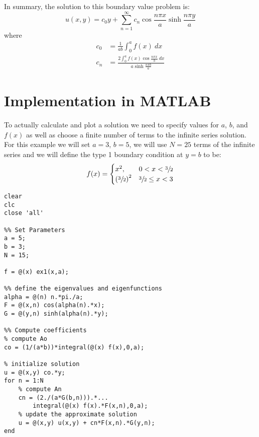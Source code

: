 \vspace{0.25cm}

\noindent In summary, the solution to this boundary value problem is:
\begin{equation*}
u(x,y) = c_0y + \sum\limits_{n=1}^{\infty} c_n \cos{\frac{n \pi x}{a}} \sinh{\frac{n \pi y}{a}}
\end{equation*}
where
\begin{align*}
c_0 &= \frac{1}{ab}\int_0^a f(x) \ dx \\
c_n &= \frac{2\int_0^a f(x) \cos{\frac{n \pi x}{b}} \ dx}{a \sinh{\frac{n \pi b}{a}}}
\end{align*}

\section{Implementation in MATLAB}

To actually calculate and plot a solution we need to specify values for $a$, $b$, and $f(x)$ as well as choose a finite number of terms to the infinite series solution.  For this example we will set $a=3$, $b=5$, we will use $N=25$ terms of the infinite series and we will define the type 1 boundary condition at $y=b$ to be:
\begin{equation*}
f(x) = 
\begin{cases}
x^2, & 0 < x < \sfrac{3}{2} \\
\left(\sfrac{3}{2} \right)^2 & \sfrac{3}{2} \le x < 3
\end{cases}
\end{equation*}

\begin{lstlisting}[name=lec26-ex1, style=myMatlab]
clear
clc
close 'all'

%% Set Parameters
a = 5;
b = 3;
N = 15;

f = @(x) ex1(x,a);

%% define the eigenvalues and eigenfunctions
alpha = @(n) n.*pi./a;
F = @(x,n) cos(alpha(n).*x);
G = @(y,n) sinh(alpha(n).*y);

%% Compute coefficients
% compute Ao
co = (1/(a*b))*integral(@(x) f(x),0,a);

% initialize solution
u = @(x,y) co.*y;
for n = 1:N
    % compute An
    cn = (2./(a*G(b,n))).*...
        integral(@(x) f(x).*F(x,n),0,a);
    % update the approximate solution
    u = @(x,y) u(x,y) + cn*F(x,n).*G(y,n);
end
\end{lstlisting}

\vspace{0.2cm}

